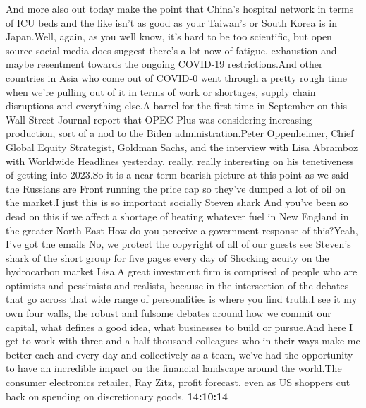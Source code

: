 \documentclass{article}%
\begin{document}
And more also out today make the point that China's hospital network in terms of ICU beds and the like isn't as good as your Taiwan's or South Korea is in Japan.Well, again, as you well know, it's hard to be too scientific, but open source social media does suggest there's a lot now of fatigue, exhaustion and maybe resentment towards the ongoing COVID{-}19 restrictions.And other countries in Asia who come out of COVID{-}0 went through a pretty rough time when we're pulling out of it in terms of work or shortages, supply chain disruptions and everything else.A barrel for the first time in September on this Wall Street Journal report that OPEC Plus was considering increasing production, sort of a nod to the Biden administration.Peter Oppenheimer, Chief Global Equity Strategist, Goldman Sachs, and the interview with Lisa Abramboz with Worldwide Headlines yesterday, really, really interesting on his tenetiveness of getting into 2023.So it is a near{-}term bearish picture at this point as we said the Russians are Front running the price cap so they've dumped a lot of oil on the market.I just this is so important socially Steven shark And you've been so dead on this if we affect a shortage of heating whatever fuel in New England in the greater North East How do you perceive a government response of this?Yeah, I've got the emails No, we protect the copyright of all of our guests see Steven's shark of the short group for five pages every day of Shocking acuity on the hydrocarbon market Lisa.A great investment firm is comprised of people who are optimists and pessimists and realists, because in the intersection of the debates that go across that wide range of personalities is where you find truth.I see it my own four walls, the robust and fulsome debates around how we commit our capital, what defines a good idea, what businesses to build or pursue.And here I get to work with three and a half thousand colleagues who in their ways make me better each and every day and collectively as a team, we've had the opportunity to have an incredible impact on the financial landscape around the world.The consumer electronics retailer, Ray Zitz, profit forecast, even as US shoppers cut back on spending on discretionary goods.%
\textbf{14:10:14}%
\newline%
\end{document}
